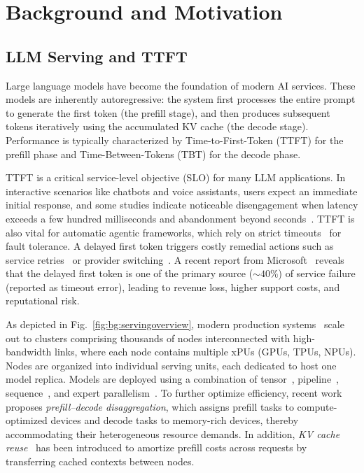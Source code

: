 \section{Background and Motivation}\label{sec:background}

\subsection{LLM Serving and TTFT}



Large language models have become the foundation of modern AI services. These models are inherently autoregressive: the system first processes the entire prompt to generate the first token (the prefill stage), and then produces subsequent tokens iteratively using the accumulated KV cache (the decode stage). Performance is typically characterized by Time-to-First-Token (TTFT) for the prefill phase and Time-Between-Tokens (TBT) for the decode phase.

TTFT is a critical service-level objective (SLO) for many LLM applications. In interactive scenarios like chatbots and voice assistants, users expect an immediate initial response, and some studies indicate noticeable disengagement when latency exceeds a few hundred milliseconds and abandonment beyond seconds~\cite{vijaya2025aqua,liu2025m,kim2025seconds}. TTFT is also vital for automatic agentic frameworks, which rely on strict timeouts~\cite{langfuse,LiteLLM} for fault tolerance. A delayed first token triggers costly remedial actions such as service retries~\cite{Medium1,Medium2} or provider switching~\cite{notdiamond}. A recent report from Microsoft~\cite{ranganathan2025enhancing} reveals that the delayed first token is one of the primary source ($\sim 40\%$) of service failure (reported as timeout error), leading to revenue loss, higher support costs, and reputational risk.

As depicted in Fig.~\ref{fig:bg:servingoverview}, modern production systems~\cite{mooncake,deepseektech} scale out to clusters comprising thousands of nodes interconnected with high-bandwidth links, where each node contains multiple xPUs (\eg GPUs, TPUs, NPUs). Nodes are organized into individual serving units, each dedicated to host one model replica. Models are deployed using a combination of tensor~\cite{narayanan2021efficient}, pipeline~\cite{narayanan2019pipedream, alphaserve}, sequence~\cite{ringattention,wu2024loongserve,CP}, and expert parallelism~\cite{expertparallel,deepspeedMoE,deepseektech,comet}. To further optimize efficiency, recent work~\cite{distserve,splitwise,strati2024d,hu2024inference}  proposes \emph{prefill–decode disaggregation}, which assigns prefill tasks to compute-optimized devices and decode tasks to memory-rich devices, thereby accommodating their heterogeneous resource demands. In addition, \emph{KV cache reuse}~\cite{mooncakefast,hu2024memserve,cachedattention,cacheblend} has been introduced to amortize prefill costs across requests by transferring cached contexts between nodes.

